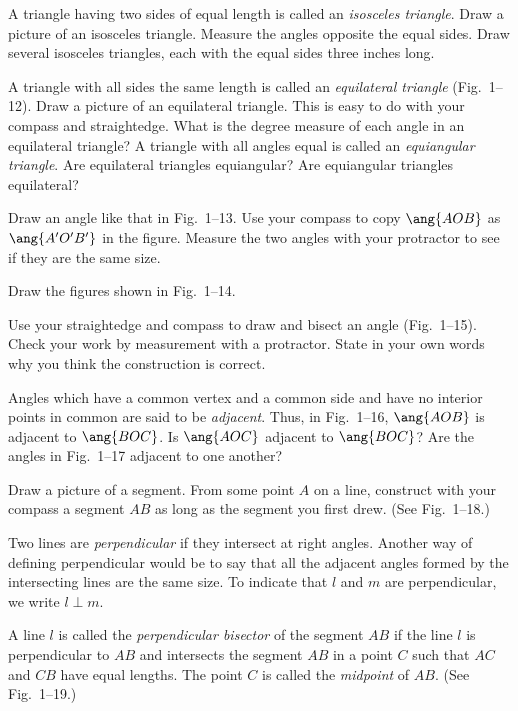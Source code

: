 \documentclass[11pt]{book}
\theoremstyle{bkplain}
\theoremstyle{XIplainnote}
\theoremstyle{bkplain}
\theoremstyle{bkplain}
\begin{document}
\begin{exercisecols}
\begin{exlist}
\item A triangle having two sides of equal length is called an \emph{isosceles
      triangle}. Draw a picture of an isosceles triangle. Measure the angles
      opposite the equal sides. Draw several isosceles triangles, each with the
      equal sides three inches long.
\item A triangle with all sides the same length is called an \emph{equilateral
      triangle} (Fig.~1--12). Draw a picture of an equilateral triangle. This is
      easy to do with your compass and straightedge. What is the degree measure of
      each angle in an equilateral triangle? A triangle with all angles equal is
      called an \emph{equiangular triangle}. Are equilateral triangles
      equiangular? Are equiangular triangles equilateral?
\exfig{\FIGITWELVE}
\item Draw an angle like that in Fig.~1--13. Use your compass to copy $\ang{AOB}$
      as $\ang{A'O'B'}$ in the figure. Measure the two angles with your protractor
      to see if they are the same size.
\exfig{\FIGITHIRTEEN}
\item Draw the figures shown in Fig.~1--14.
\exfig{\FIGIFOURTEEN}
\item Use your straightedge and compass to draw and bisect an angle
      (Fig.~1--15). Check your work by measurement with a protractor. State in
      your own words why you think the construction is correct.
\exfig{\FIGIFIFTEEN}
\item Angles which have a common vertex and a common side and have no interior
      points in common are said to be \emph{adjacent}. Thus, in Fig.~1--16,
      $\ang{AOB}$ is adjacent to $\ang{BOC}$. Is $\ang{AOC}$ adjacent to
      $\ang{BOC}$? Are the angles in Fig.~1--17 adjacent to one another?
\exfig{\FIGISIXTEEN}
\exfig{\FIGISEVENTEEN}
\item Draw a picture of a segment. From some point $A$ on a line, construct with
      your compass a segment $AB$ as long as the segment you first drew. (See
      Fig.~1--18.)
\exfig{\FIGIEIGHTEEN}
\item Two lines are \emph{perpendicular} if they intersect at right angles.
      Another way of defining perpendicular would be to say that all the adjacent
      angles formed by the intersecting lines are the same size. To indicate that
      $l$ and $m$ are perpendicular, we write $l \perp m$.

      A line $l$ is called the \emph{perpendicular bisector} of the segment $AB$
      if the line $l$ is perpendicular to $AB$ and intersects the segment $AB$ in
      a point $C$ such that $AC$ and $CB$ have equal lengths. The point $C$ is
      called the \emph{midpoint} of $AB$. (See Fig.~1--19.)


\end{exlist}
\end{exercisecols}
\end{document}
